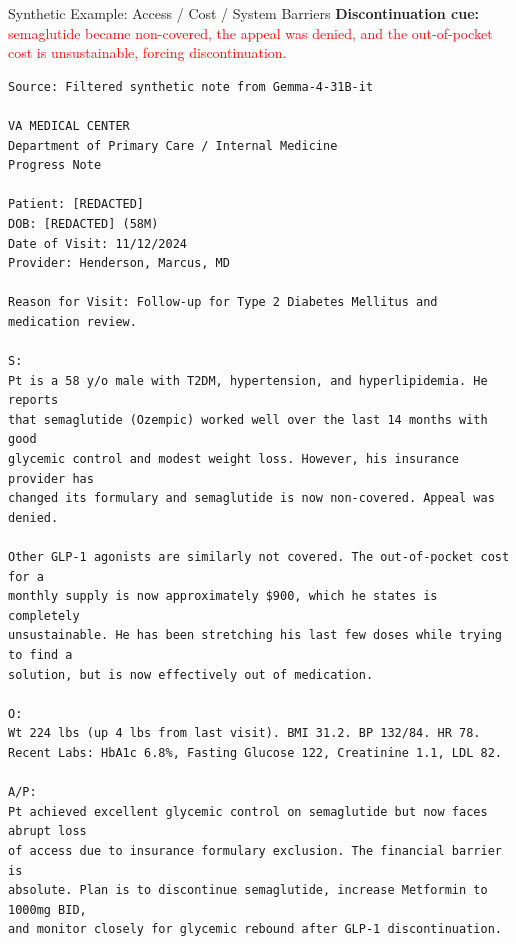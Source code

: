 \documentclass[aspectratio=169]{beamer}
\begin{document}
\begin{frame}{Synthetic Example: Access / Cost / System Barriers}
\tiny
\textbf{Discontinuation cue:}
\textcolor{red}{semaglutide became non-covered, the appeal was denied, and the out-of-pocket cost is unsustainable, forcing discontinuation.}

\vspace{0.5em}
\begin{verbatim}
Source: Filtered synthetic note from Gemma-4-31B-it

VA MEDICAL CENTER
Department of Primary Care / Internal Medicine
Progress Note

Patient: [REDACTED]
DOB: [REDACTED] (58M)
Date of Visit: 11/12/2024
Provider: Henderson, Marcus, MD

Reason for Visit: Follow-up for Type 2 Diabetes Mellitus and medication review.

S:
Pt is a 58 y/o male with T2DM, hypertension, and hyperlipidemia. He reports
that semaglutide (Ozempic) worked well over the last 14 months with good
glycemic control and modest weight loss. However, his insurance provider has
changed its formulary and semaglutide is now non-covered. Appeal was denied.

Other GLP-1 agonists are similarly not covered. The out-of-pocket cost for a
monthly supply is now approximately $900, which he states is completely
unsustainable. He has been stretching his last few doses while trying to find a
solution, but is now effectively out of medication.

O:
Wt 224 lbs (up 4 lbs from last visit). BMI 31.2. BP 132/84. HR 78.
Recent Labs: HbA1c 6.8%, Fasting Glucose 122, Creatinine 1.1, LDL 82.

A/P:
Pt achieved excellent glycemic control on semaglutide but now faces abrupt loss
of access due to insurance formulary exclusion. The financial barrier is
absolute. Plan is to discontinue semaglutide, increase Metformin to 1000mg BID,
and monitor closely for glycemic rebound after GLP-1 discontinuation.
\end{verbatim}
\end{frame}
\end{document}
